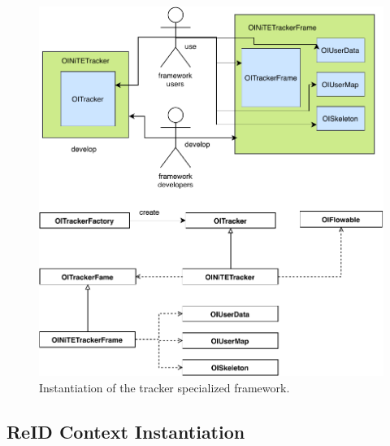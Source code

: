 \begin{figure}
    \centering
    \includegraphics[scale=0.7]{figures/framework_inst_tracker.pdf}
    \caption{Instantiation of the tracker specialized framework.}
    \label{fig:fw-skeleton-tracker}
\end{figure}

\subsection{ReID Context Instantiation}
\label{sec:fw-inst-context}

